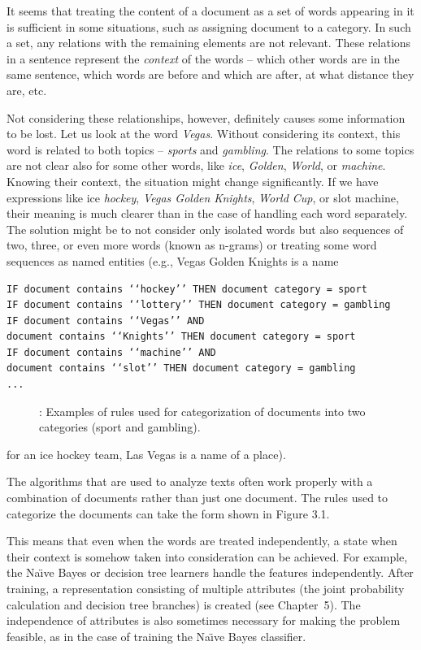 It seems that treating the content of a document as a set of words appearing
in it is sufficient in some situations, such as assigning document to a category.
In such a set, any relations with the remaining elements are not relevant. These
relations in a sentence represent the \textit{context} of the words – which other words
are in the same sentence, which words are before and which are after, at what
distance they are, etc.

Not considering these relationships, however, definitely causes some information to be lost. Let us look at the word \textit{Vegas}. Without considering its context,
this word is related to both topics – \textit{sports} and \textit{gambling}. The relations to some
topics are not clear also for some other words, like \textit{ice}, \textit{Golden}, \textit{World}, or \textit{machine}. Knowing their context, the situation might change significantly. If we have
expressions like ice \textit{hockey}, \textit{Vegas Golden Knights}, \textit{World Cup}, or slot machine,
their meaning is much clearer than in the case of handling each word separately.
The solution might be to not consider only isolated words but also sequences
of two, three, or even more words (known as n-grams) or treating some word sequences as named entities (e.g., Vegas Golden Knights is a name

\begin{verbatim}
IF document contains ‘‘hockey’’ THEN document category = sport
IF document contains ‘‘lottery’’ THEN document category = gambling
IF document contains ‘‘Vegas’’ AND
document contains ‘‘Knights’’ THEN document category = sport
IF document contains ‘‘machine’’ AND
document contains ‘‘slot’’ THEN document category = gambling
...
\end{verbatim}

\begin{figure}[H]
    \centering
    \caption{: Examples of rules used for categorization of documents into two categories (sport
and gambling).}
    \label{fig:placeholder31}
\end{figure}

\hspace{-1.5em}for an ice hockey team, Las Vegas is a name of a place).

The algorithms that are used to analyze texts often work properly with a combination of documents rather than just one document. The rules used to categorize the documents can take the form shown in Figure 3.1.

This means that even when the words are treated independently, a state when
their context is somehow taken into consideration can be achieved. For example,
the Na\"{\i}ve Bayes or decision tree learners handle the features independently. After
training, a representation consisting of multiple attributes (the joint probability
calculation and decision tree branches) is created (see Chapter~5). The independence
of attributes is also sometimes necessary for making the problem feasible,
as in the case of training the Na\"{\i}ve Bayes classifier. 

